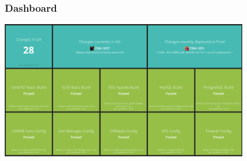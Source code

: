\documentclass[aspectratio=169]{beamer}
\begin{document}

\begin{frame}
    \frametitle{Dashboard}
        \begin{center}
            \includegraphics[width=0.8\textwidth]{CI-dashboard.png}
        \end{center}
\end{frame}

\end{document}
